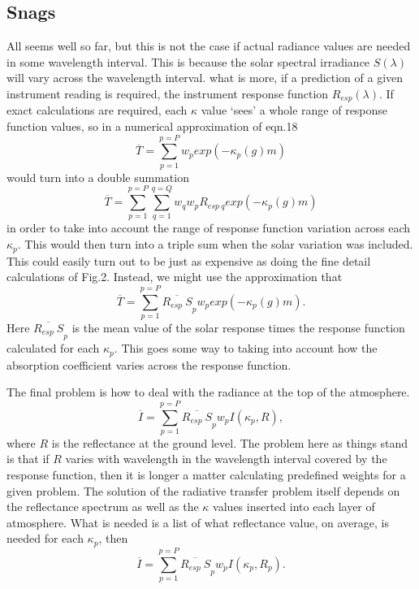 \documentclass[12pt]{article}
\begin{document}
\subsection{Snags}

All seems well so far, but this is not the case if actual radiance values
are needed in some wavelength interval. This is because the solar spectral
irradiance $S(\lambda)$ will vary across the wavelength interval. what is more, if
a prediction of a given instrument reading is required, the instrument response
function $R_{esp}(\lambda)$. If exact calculations are required, each
$\kappa$ value `sees' a whole range of response function values, so in a numerical
approximation of eqn.18
\begin{equation}
\overline{T} =\sum_{p=1}^{p=P} w_p exp(-\kappa_p(g) m) 
\end{equation}
would  turn into a double summation
\begin{equation}
\overline{T} =\sum_{p=1}^{p=P} \sum_{q=1}^{q=Q} w_q w_p R_{esp \> q} exp(-\kappa_p(g) m) 
\end{equation}
in order to take into account the range of response function variation across each $\kappa_p$.
This would then  turn into a triple sum when the solar variation was included.  This
could easily turn out to be just as expensive as doing the fine detail calculations
of Fig.2. Instead, we might use  the approximation that
\begin{equation}
\overline{T} =\sum_{p=1}^{p=P} \overline{R_{esp}\> S}_p w_p exp(-\kappa_p(g) m). 
\end{equation}
Here $\overline{R_{esp}\> S}_p$ is the mean value of the solar response 
times the response function calculated for each $\kappa_p$. This goes some way
to taking into account how the absorption coefficient varies across the
response function.

The final problem is how to deal with the radiance at the top of the atmosphere.
\begin{equation}
\overline{I} =\sum_{p=1}^{p=P} \overline{R_{esp}\> S}_p w_p I \left ({\kappa_p,R} \right ),
\end{equation}
where $R$ is the reflectance at the ground level. The problem here as things stand
is that if $R$ varies with wavelength in the wavelength interval covered by
the response function, then it is longer a matter calculating predefined 
weights for a given problem. The solution of the radiative transfer problem itself
depends on the reflectance spectrum as well as the $\kappa$ values
inserted into each layer of atmosphere. What is needed is a list of what reflectance
value, on average, is needed for each $\kappa_p$, then
\begin{equation}
\overline{I} =\sum_{p=1}^{p=P} \overline{R_{esp}\> S}_p w_p I \left ({\kappa_p,R_p}\right ).
\end{equation}
\end{document}

